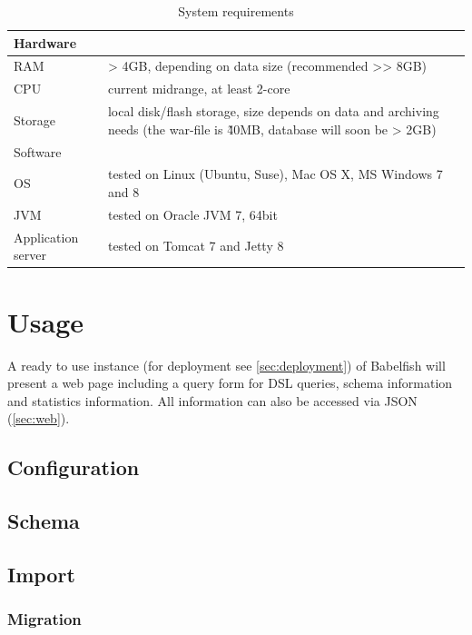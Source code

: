 \begin{table}[H]
\begin{tabularx}{\textwidth}{lX}
\toprule
Hardware \\
\midrule
RAM & > 4GB, depending on data size (recommended >> 8GB) \\
CPU &  current midrange, at least 2-core \\
Storage & local disk/flash storage, size depends on data and archiving needs (the war-file is \~40MB, database will soon be > 2GB)\\
\midrule
Software \\
\midrule
OS & tested on Linux (Ubuntu, Suse), Mac OS X, MS Windows 7 and 8\\
JVM & tested on Oracle JVM 7, 64bit\\
Application server & tested on Tomcat 7 and Jetty 8 \\
\bottomrule
\end{tabularx}
\caption{System requirements}\label{tbl:sysReq}
\end{table}

\chapter{Usage}\label{sec:usage}
A ready to use instance (for deployment see \cref{sec:deployment}) of Babelfish will present a web page including a query form for DSL queries, schema information and statistics information. All information can also be accessed via JSON (\cref{sec:web}).

\section{Configuration}\label{sec:config} \todo



\section{Schema}\label{sec:schema} \todo

\section{Import}\label{sec:import} \todo
{}

\subsection{Migration}

